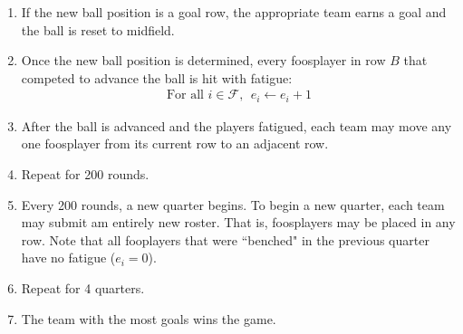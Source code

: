 \documentclass[12pt,letterpaper,twoside]{article}
\begin{document}
\begin{enumerate}
\item If the new ball position is a goal row, the appropriate team earns a goal and the ball is reset to midfield.

\item Once the new ball position is determined, every foosplayer in row $B$ that competed to advance the ball is hit with fatigue:
\begin{align*}
\text{For all } i \in \mathcal{F}, \ \ e_i \leftarrow e_i + 1
\end{align*}

\item After the ball is advanced and the players fatigued, each team may move any one foosplayer from its current row to an adjacent row.

\item Repeat for 200 rounds.

\item Every 200 rounds, a new quarter begins. To begin a new quarter, each team may submit am entirely new roster. That is, foosplayers may be placed in any row. Note that all fooplayers that were ``benched" in the previous quarter have no fatigue ($e_i = 0$).

\item Repeat for 4 quarters.

\item The team with the most goals wins the game.
\end{enumerate}
\end{document}

